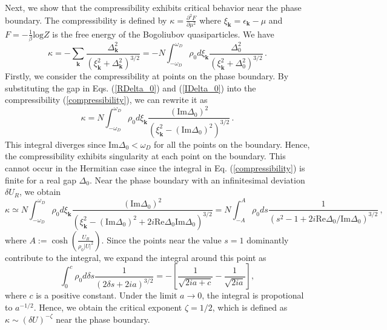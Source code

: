 \documentclass[aps,prl,twocolumn,nofootinbib,superscriptaddress,longbibliography]{revtex4-1}
\begin{document}
Next, we show that the compressibility exhibits critical behavior near the phase boundary. The compressibility is defined by $\kappa=\frac{\partial^2F}{\partial\mu^2}$ where $\xi_{\bm{k}}=\epsilon_{\bm{k}}-\mu$ and $F=-\frac{1}{\beta}\text{log}Z$ is the free energy of the Bogoliubov quasiparticles. We have
\begin{equation}
  \kappa = - \sum_{\bm{k}} \frac{\Delta_{\bm{k}}^2}{(\xi_{\bm{k}}^2 +
  \Delta_{\bm{k}}^2)^{3 / 2}} = - N\int_{- \omega_D}^{\omega_D} \rho_0 d
  \xi_{\bm{k}} \frac{\Delta_0^2}{(\xi_{\bm{k}}^2 + \Delta_0^2)^{3
  / 2}}\,.
  \label{compressibility}
\end{equation}
Firstly, we consider the compressibility at points on the phase boundary. By substituting the gap in Eqs. (\ref{RDelta_0}) and (\ref{IDelta_0}) into the compressibility (\ref{compressibility}), we can rewrite it as
\begin{equation}
  \kappa= N\int_{- \omega_D}^{\omega_D} \rho_0 d \xi_{\bm{k}}
  \frac{(\text{Im} \Delta_0)^2}{(\xi_{\bm{k}}^2 - (\text{Im}
  \Delta_0)^2)^{3 / 2}}\,.
\end{equation}
This integral diverges since $\text{Im} \Delta_0 < \omega_D$ for all the points on the boundary. Hence, the compressibility exhibits singularity at each point on the boundary. This cannot occur in the Hermitian case since the integral in Eq. (\ref{compressibility}) is finite for a real gap $\Delta_0$. Near the phase boundary with an infinitesimal deviation $\delta U_R$, we obtain
\begin{equation}
	\kappa\simeq N\int_{- \omega_D}^{\omega_D} \rho_0 d \xi_{\bm{k}}
  \frac{(\text{Im} \Delta_0)^2}{(\xi_{\bm{k}}^2 - (\text{Im} \Delta_0)^2
  + 2 i \text{Re} \Delta_0 \text{Im} \Delta_0)^{3 / 2}} = N\int_{- A}^A \rho_0
  ds \frac{1}{(s^2 - 1 + 2 i \text{Re}
  \Delta_0 / \text{Im} \Delta_0)^{3 / 2}}\,,
\end{equation}
where $A := \cosh \left( \frac{U_R}{\rho_0 | U |^2} \right)$. Since the points near the value $s = 1$ dominantly contribute to the integral, we expand the integral around this point as
\begin{equation}
  \int_{0}^{c} \rho_0 d \delta s \frac{1}{(2 \delta
  s+ 2 i a)^{3 / 2}}=-[\frac{1}{\sqrt{2ia+c}}-\frac{1}{\sqrt{2ia}}],
\end{equation}
where $c$ is a positive constant. Under the limit $a\to0$, the integral is propotional to $a^{-1/2}$. Hence, we obtain the critical exponent $\zeta = 1 / 2$, which is defined as $\kappa \sim (\delta U)^{- \zeta}$ near the phase boundary.
\end{document}
